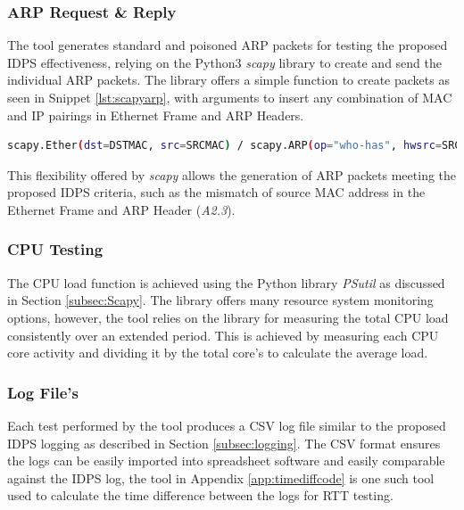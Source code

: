 \documentclass[12pt, oneside]{book}
\begin{document}
\subsubsection{ARP Request \& Reply}
The tool generates standard and poisoned ARP packets for testing the proposed IDPS effectiveness,
relying on the Python3 \emph{scapy} library to create and send the individual ARP packets. The library
offers a simple function to create packets as seen in Snippet \ref{lst:scapyarp}, with arguments to insert any 
combination of MAC and IP pairings in Ethernet Frame and ARP Headers.

\begin{lstlisting}[language=Bash,caption={Scapy ARP packet creation},captionpos=b,label={lst:scapyarp}]
scapy.Ether(dst=DSTMAC, src=SRCMAC) / scapy.ARP(op="who-has", hwsrc=SRCMAC, psrc=SRCIP, hwdst=DSTMAC, pdst=DSTIP)
\end{lstlisting}

This flexibility offered by \emph{scapy} allows the generation of ARP packets meeting the proposed IDPS criteria, such as
the mismatch of source MAC address in the Ethernet Frame and ARP Header (\emph{A2.3}).

\subsubsection{CPU Testing}
The CPU load function is achieved using the Python library \emph{PSutil} as discussed in Section \ref{subsec:Scapy}.
The library offers many resource system monitoring options, however, the tool relies on the library for measuring
the total CPU load consistently over an extended period. This is achieved by measuring each CPU core activity
and dividing it by the total core's to calculate the average load.

\subsubsection{Log File's}
Each test performed by the tool produces a CSV log file similar to
the proposed IDPS logging as described in Section \ref{subsec:logging}. The CSV format ensures the logs can be easily 
imported into spreadsheet software and easily comparable against the IDPS log, the tool in Appendix \ref{app:timediffcode}
is one such tool used to calculate the time difference between the logs for RTT testing.
\end{document}
